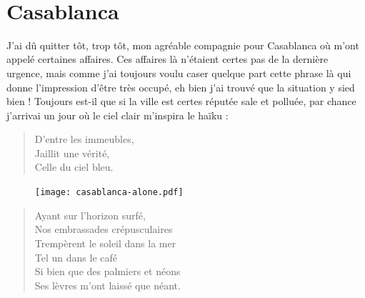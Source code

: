 \newpage{}
\thispagestyle{empty}
~
\vfill
\pagebreak


\section*{Casablanca}


\begin{prose}
  J’ai dû quitter tôt, trop tôt, mon agréable compagnie pour Casablanca où m’ont appelé certaines affaires. Ces affaires là n’étaient certes pas de la dernière urgence, mais comme j’ai toujours voulu caser quelque part cette phrase là qui donne l’impression d’être très occupé, eh bien j’ai trouvé que la situation y sied bien ! Toujours est-il que si la ville est certes réputée sale et polluée, par chance j’arrivai un jour où le ciel clair m’inspira le haïku :
\end{prose}

\begin{verse}\haiku
  D’entre les immeubles,\\  %
  Jaillit une vérité,\\  %
  Celle du ciel bleu.
\end{verse}

\begin{figure}[h]
  \centering
  \texttt{[image: casablanca-alone.pdf]}
  \captionsetup{labelformat=empty}
  \caption[Idéotexte de  (\textarabic{البيضاء}.)]{}
\end{figure}

\begin{verse}\sizain
  Ayant sur l’horizon surfé,\\ 
  Nos embrassades crépusculaires\\ 
  Trempèrent  le soleil dans la mer\\ 
  Tel un  dans le café\\ 
  Si bien que des palmiers et néons\\ 
  Ses lèvres m’ont laissé que néant.  %
\end{verse}

